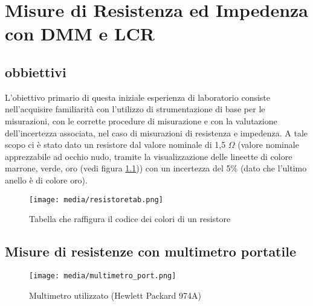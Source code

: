 

\chapter{Misure di Resistenza ed Impedenza con DMM e LCR}
\label{chap:prima_prova}


\section{obbiettivi}
\label{sec:ob1}


L'obiettivo primario di questa iniziale esperienza di laboratorio consiste nell'acquisire familiarità con l'utilizzo di strumentazione di base per le misurazioni, con le corrette procedure di misurazione e con la valutazione dell'incertezza associata, nel caso di misurazioni di resistenza e impedenza.
\newline \newline
A tale scopo ci è stato dato un resistore dal valore nominale di 1,5 $\Omega$ (valore nominale apprezzabile ad occhio nudo, tramite la visualizzazione delle lineette di colore marrone, verde, oro (vedi figura \ref{fig:resistore})) con un incertezza del 5\% (dato che l'ultimo anello è di colore oro).

\begin{figure}[h]
    \centering
    \texttt{[image: media/resistoretab.png]}
    \caption{Tabella che raffigura il codice dei colori di un resistore}
    \label{fig:resistore}
\end{figure}















\section{Misure di resistenze con multimetro portatile}
\label{sec:mult_port}

\begin{figure}[h]
    \centering
    \texttt{[image: media/multimetro\_port.png]}
    \caption{Multimetro utilizzato (Hewlett Packard 974A)}
    \label{fig:multimetro_port}
\end{figure}

